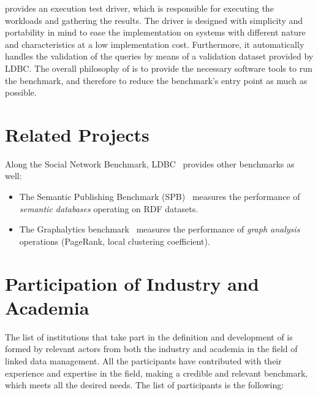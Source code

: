 \ldbcsnb provides an execution test driver, which is responsible for executing
the workloads and gathering the results. The driver is designed with simplicity
and portability in mind to ease the implementation on systems with different
nature and characteristics at a low implementation cost. Furthermore, it
automatically handles the validation of the queries by means of a validation
dataset provided by LDBC.  The overall philosophy of \ldbcsnb is to provide
the necessary software tools to run the benchmark, and therefore to reduce the
benchmark's entry point as much as possible.


\section{Related Projects}

Along the Social Network Benchmark, LDBC~\cite{DBLP:journals/sigmod/AnglesBLF0ENMKT14} provides other benchmarks as well:

\begin{itemize}
	\item The Semantic Publishing Benchmark (SPB)~\cite{DBLP:conf/semweb/SpasicJP16} measures the performance of \emph{semantic databases} operating on RDF datasets.
	\item The Graphalytics benchmark~\cite{DBLP:journals/pvldb/IosupHNHPMCCSAT16} measures the performance of \emph{graph analysis} operations (\eg PageRank, local clustering coefficient).
\end{itemize}


\section{Participation of Industry and Academia}

The list of institutions that take part in the definition and development
of \ldbcsnb is formed by relevant actors from both the industry and academia in
the field of linked data management. All the participants have contributed with
their experience and expertise in the field, making a credible and relevant
benchmark, which meets all the desired needs. The list of participants is the
following:

